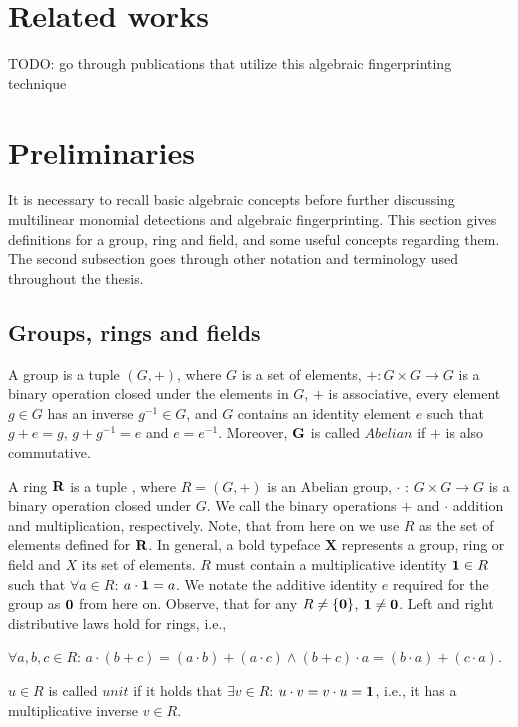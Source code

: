 \section{Related works} %

TODO: go through publications that utilize this algebraic fingerprinting technique

\section{Preliminaries}

It is necessary to recall basic algebraic concepts 
before further discussing multilinear monomial detections and algebraic fingerprinting. 
This section gives definitions for a group, ring and field, and some useful concepts 
regarding them. The second subsection goes through other notation and terminology used 
throughout the thesis.

\subsection{Groups, rings and fields} %

A group 
is a tuple $(G, +)$, where $G$ is a set of elements,
$+ \colon G \times G \to G$
is a binary operation closed under 
the elements in $G$, $+$ is associative, every element $g\in G$ has an inverse $g^{-1}\in G$, and $G$ contains 
an identity element $e$ such that $g + e = g$, $g + g^{-1} = e$ and $e = e^{-1}$. Moreover, $\textbf G$ is called $Abelian$ if 
$+$ is also commutative.

A ring $\textbf R$ is a tuple
,
where $R = (G, +)$ is an Abelian group, $\cdot$ : $G \times G \longrightarrow G$ 
is a binary operation closed under $G$. We call the binary operations $+$ and
$\cdot$
addition and multiplication, respectively. 
Note, that from here on we use $R$ as the set of elements defined for $\textbf R$. 
In general, a bold typeface \textbf X represents a group, ring or field and $X$ its set of elements. 
$R$ must contain a multiplicative identity $\textbf 1 \in R$ such that $\forall a \in R$: $a \cdot \textbf 1 = a$. 
We notate the additive identity $e$ required for the group as $\textbf 0$ from here on. 
Observe, that for any $R \neq \{\textbf 0\}$, $\textbf 1 \neq \textbf 0$.  
Left and right distributive laws hold for rings, i.e., 
\begin{center}
  $\forall a, b, c \in R$: $a \cdot (b + c) = (a \cdot b) + (a \cdot c) \land (b + c) \cdot a = (b \cdot a) + (c \cdot a)$.
\end{center}
$u \in R$ is called $unit$ if it holds that $\exists v \in R$: $u \cdot v = v \cdot u = \textbf 1$, 
i.e., it has a multiplicative inverse $v \in R$.

